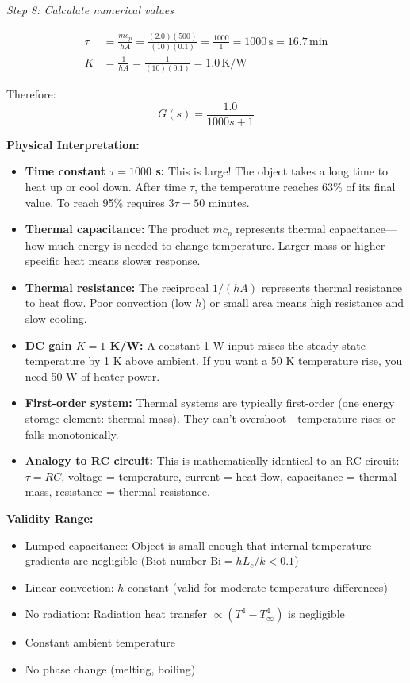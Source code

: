 \begin{example}
\textit{Step 8: Calculate numerical values}

\begin{align}
\tau &= \frac{mc_p}{hA} = \frac{(2.0)(500)}{(10)(0.1)} = \frac{1000}{1} = 1000\,\text{s} = 16.7\,\text{min} \\
K &= \frac{1}{hA} = \frac{1}{(10)(0.1)} = 1.0\,\text{K/W}
\end{align}

Therefore:
\begin{equation}
\boxed{G(s) = \frac{1.0}{1000s + 1}}
\end{equation}

\textbf{Physical Interpretation:}

\begin{itemize}
    \item \textbf{Time constant $\tau = 1000$ s:} This is large! The object takes a long time to heat up or cool down. After time $\tau$, the temperature reaches 63\% of its final value. To reach 95\% requires $3\tau = 50$ minutes.

    \item \textbf{Thermal capacitance:} The product $mc_p$ represents thermal capacitance—how much energy is needed to change temperature. Larger mass or higher specific heat means slower response.

    \item \textbf{Thermal resistance:} The reciprocal $1/(hA)$ represents thermal resistance to heat flow. Poor convection (low $h$) or small area means high resistance and slow cooling.

    \item \textbf{DC gain $K = 1$ K/W:} A constant 1 W input raises the steady-state temperature by 1 K above ambient. If you want a 50 K temperature rise, you need 50 W of heater power.

    \item \textbf{First-order system:} Thermal systems are typically first-order (one energy storage element: thermal mass). They can't overshoot—temperature rises or falls monotonically.

    \item \textbf{Analogy to RC circuit:} This is mathematically identical to an RC circuit: $\tau = RC$, voltage = temperature, current = heat flow, capacitance = thermal mass, resistance = thermal resistance.
\end{itemize}

\textbf{Validity Range:}

\begin{itemize}
    \item Lumped capacitance: Object is small enough that internal temperature gradients are negligible (Biot number $\text{Bi} = h L_c / k < 0.1$)
    \item Linear convection: $h$ constant (valid for moderate temperature differences)
    \item No radiation: Radiation heat transfer $\propto (T^4 - T_\infty^4)$ is negligible
    \item Constant ambient temperature
    \item No phase change (melting, boiling)
\end{itemize}


\end{example}
